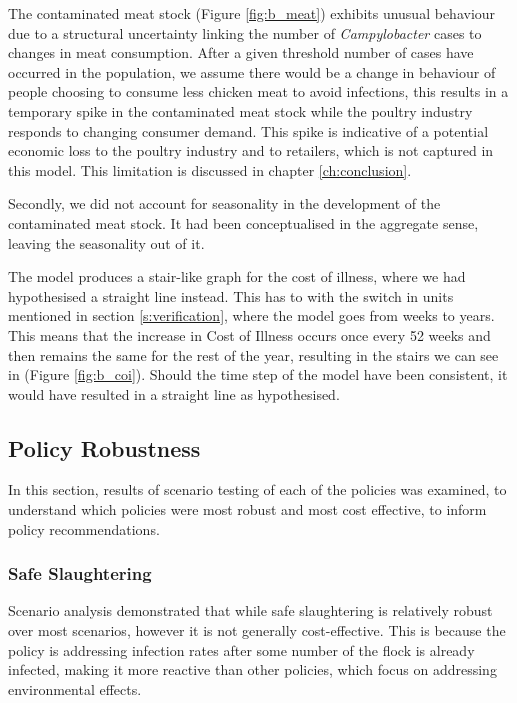 The contaminated meat stock (Figure \ref{fig:b_meat}) exhibits unusual behaviour due to a structural uncertainty linking the number of \textit{Campylobacter} cases to changes in meat consumption. After a given threshold number of cases have occurred in the population, we assume there would be a change in behaviour of people choosing to consume less chicken meat to avoid infections, this results in a temporary spike in the contaminated meat stock while the poultry industry responds to changing consumer demand. This spike is indicative of a potential economic loss to the poultry industry and to retailers, which is not captured in this model. This limitation is discussed in chapter \ref{ch:conclusion}.

Secondly, we did not account for seasonality in the development of the contaminated meat stock. It had been conceptualised in the aggregate sense, leaving the seasonality out of it. 

The model produces a stair-like graph for the cost of illness, where we had hypothesised a straight line instead. This has to with the switch in units mentioned in section \ref{s:verification}, where the model goes from weeks to years. This means that the increase in Cost of Illness occurs once every 52 weeks and then remains the same for the rest of the year, resulting in the stairs we can see in (Figure \ref{fig:b_coi}). Should the time step of the model have been consistent, it would have resulted in a straight line as hypothesised. 


\subsection{Policy Robustness}
In this section, results of scenario testing of each of the policies was examined, to understand which policies were most robust and most cost effective, to inform policy recommendations.

\subsubsection{Safe Slaughtering}
\label{sec: safe slaughtering}
Scenario analysis demonstrated that while safe slaughtering is relatively robust over most scenarios, however it is not generally cost-effective. This is because the policy is addressing infection rates after some number of the flock is already infected, making it more reactive than other policies, which focus on addressing environmental effects.

